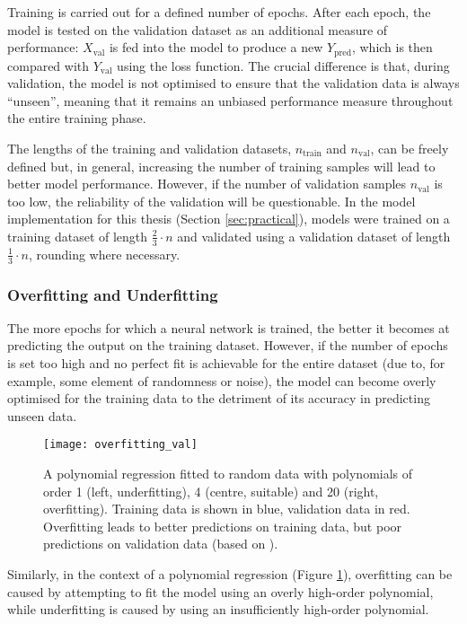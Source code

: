 Training is carried out for a defined number of epochs. After each epoch, the model is tested on the validation dataset as an additional measure of performance: \(X_{\text{val}}\) is fed into the model to produce a new \(Y_{\text{pred}}\), which is then compared with \(Y_{\text{val}}\) using the loss function. The crucial difference is that, during validation, the model is not optimised to ensure that the validation data is always ``unseen'', meaning that it remains an unbiased performance measure throughout the entire training phase.

The lengths of the training and validation datasets, \(n_{\text{train}}\) and \(n_{\text{val}}\), can be freely defined but, in general, increasing the number of training samples will lead to better model performance. However, if the number of validation samples \(n_{\text{val}}\) is too low, the reliability of the validation will be questionable. In the model implementation for this thesis (Section \ref{sec:practical}), models were trained on a training dataset of length \(\frac{2}{3} \cdot n\) and validated using a validation dataset of length \(\frac{1}{3} \cdot n\), rounding where necessary.

\subsubsection{Overfitting and Underfitting}
The more epochs for which a neural network is trained, the better it becomes at predicting the output on the training dataset. However, if the number of epochs is set too high and no perfect fit is achievable for the entire dataset (due to, for example, some element of randomness or noise), the model can become overly optimised for the training data to the detriment of its accuracy in predicting unseen data.

\begin{figure}
    \centering
    \texttt{[image: overfitting\_val]}
    \caption{\label{fig:overfitting} A polynomial regression fitted to random data with polynomials of order 1 (left, underfitting), 4 (centre, suitable) and 20 (right, overfitting). Training data is shown in blue, validation data in red. Overfitting leads to better predictions on training data, but poor predictions on validation data (based on \protect\cite[]{vanderplas_python_2016}).}
\end{figure}

Similarly, in the context of a polynomial regression (Figure \ref{fig:overfitting}), overfitting can be caused by attempting to fit the model using an overly high-order polynomial, while underfitting is caused by using an insufficiently high-order polynomial. \cite[p. 365]{vanderplas_python_2016}

